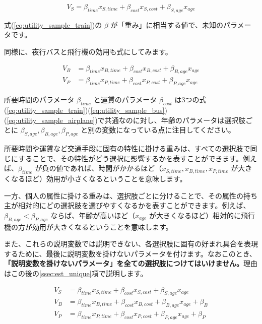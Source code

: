 \begin{equation}
    \label{eq:utility_sample_train}
    V_S=\beta_{time}x_{S,time}+\beta_{cost} x_{S,cost}+\beta_{S,age}x_{age}
\end{equation}

式(\ref{eq:utility_sample_train})の $\beta$ が「重み」に相当する値で、未知のパラメータです。

同様に、夜行バスと飛行機の効用も式にしてみます。

\begin{align}
    V_B & =\beta_{time}x_{B,time}+\beta_{cost} x_{B,cost}+\beta_{B,age}x_{age} \label{eq:utility_sample_bus}      \\
    V_P & =\beta_{time}x_{P,time}+\beta_{cost} x_{P,cost}+\beta_{P,age}x_{age} \label{eq:utility_sample_airplane}
\end{align}

所要時間のパラメータ $\beta_{time}$ と運賃のパラメータ $\beta_{cost}$ は3つの式(\ref{eq:utility_sample_train})(\ref{eq:utility_sample_bus})(\ref{eq:utility_sample_airplane})で共通なのに対し、年齢のパラメータは選択肢ごとに $\beta_{S,age}, \beta_{B,age}, \beta_{P,age}$ と別の変数になっている点に注目してください。

所要時間や運賃など交通手段に固有の特性に掛ける重みは、すべての選択肢で同じにすることで、その特性がどう選択に影響するかを表すことができます。例えば、$\beta_{time}$ が負の値であれば、時間がかかるほど（$x_{S,time}, x_{B,time}, x_{P,time}$ が大きくなるほど）効用が小さくなるということを意味します。

一方、個人の属性に掛ける重みは、選択肢ごとに分けることで、その属性の持ち主が相対的にどの選択肢を選びやすくなるかを表すことができます。例えば、$\beta_{B,age}<\beta_{P,age}$ ならば、年齢が高いほど（$x_{age}$ が大きくなるほど）相対的に飛行機の方が効用が大きくなるということを意味します。

また、これらの説明変数では説明できない、各選択肢に固有の好まれ具合を表現するために、最後に説明変数を掛けないパラメータを付けます。なおこのとき、\textbf{「説明変数を掛けないパラメータ」を全ての選択肢につけてはいけません。}理由はこの後の\ref{ssec:est_unique}項で説明します。

\begin{align}
    V_S & =\beta_{time}x_{S,time}+\beta_{cost} x_{S,cost}+\beta_{S,age}x_{age}         \\
    V_B & =\beta_{time}x_{B,time}+\beta_{cost} x_{B,cost}+\beta_{B,age}x_{age}+\beta_B \\
    V_P & =\beta_{time}x_{P,time}+\beta_{cost} x_{P,cost}+\beta_{P,age}x_{age}+\beta_P
\end{align}

